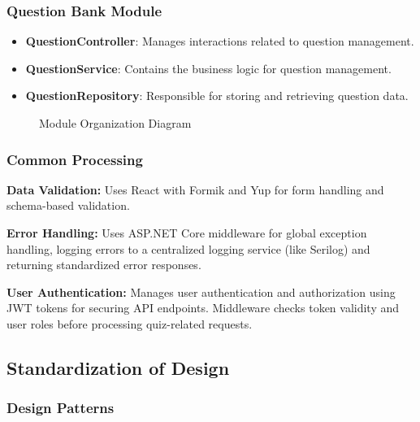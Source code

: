 \documentclass{article}
\begin{document}
\subsubsection{Question Bank Module}

\begin{itemize}
  \item \textbf{QuestionController}: Manages interactions related to question management.
  \item \textbf{QuestionService}: Contains the business logic for question management.
  \item \textbf{QuestionRepository}: Responsible for storing and retrieving question data.
\end{itemize}

\begin{figure}[htbp]
    \centering
    \caption{Module Organization Diagram}
    \label{fig:development}
\end{figure}


\subsubsection{Common Processing}

\item \textbf{Data Validation:} Uses React with Formik and Yup for form handling and schema-based validation.

\item \textbf{Error Handling:} Uses ASP.NET Core middleware for global exception handling, logging errors to a centralized logging service (like Serilog) and returning standardized error responses.

\item \textbf{User Authentication:} Manages user authentication and authorization using JWT tokens for securing API endpoints. Middleware checks token validity and user roles before processing quiz-related requests.

\subsection{Standardization of Design}

\subsubsection{Design Patterns}
\end{document}

